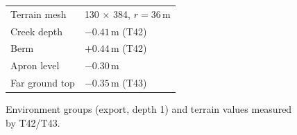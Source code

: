 \begin{figure}[h]
\centering
\begin{minipage}[t]{0.6\linewidth}\vspace{0pt}\end{minipage}\hfill
\begin{minipage}[t]{0.36\linewidth}\vspace{0pt}\footnotesize
\begin{tabular}{@{}ll@{}}\toprule
Terrain mesh & 130 $\times$ 384, $r=36$\,m\\
Creek depth & $-0.41$\,m (T42)\\
Berm & $+0.44$\,m (T42)\\
Apron level & $-0.30$\,m\\
Far ground top & $-0.35$\,m (T43)\\\bottomrule
\end{tabular}
\end{minipage}
\caption{Environment groups (export, depth 1) and terrain values measured by T42/T43.}
\end{figure}
